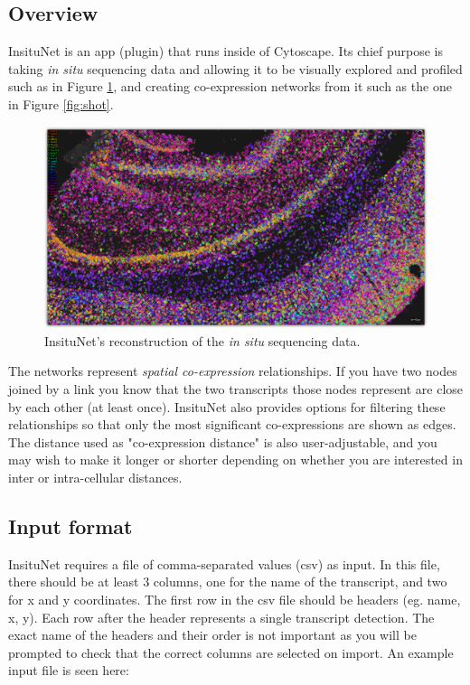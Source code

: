 \documentclass[a4paper,12pt]{article}
\begin{document}
\subsection{Overview}
InsituNet is an app (plugin) that runs inside of Cytoscape. Its chief purpose is taking \emph{in situ} sequencing data and allowing it to be visually explored and profiled such as in Figure \ref{fig:recon}, and creating co-expression networks from it such as the one in Figure \ref{fig:shot}.
\begin{figure}[h]
	\caption{InsituNet's reconstruction of the \emph{in situ} sequencing data.}\label{fig:recon}
	\centering
	\includegraphics[width=\textwidth]{reconstruction-shadow}
\end{figure}

The networks represent \emph{spatial co-expression} relationships. If you have two nodes joined by a link you know that the two transcripts those nodes represent are close by each other (at least once). InsituNet also provides options for filtering these relationships so that only the most significant co-expressions are shown as edges. The distance used as "co-expression distance" is also user-adjustable, and you may wish to make it longer or shorter depending on whether you are interested in inter or intra-cellular distances.


\subsection{Input format}
InsituNet requires a file of comma-separated values (csv) as input. In this file, there should be at least 3 columns, one for the name of the transcript, and two for x and y coordinates. The first row in the csv file should be headers (eg. name, x, y). Each row after the header represents a single transcript detection. The exact name of the headers and their order is not important as you will be prompted to check that the correct columns are selected on import. An example input file is seen here:
\end{document}
